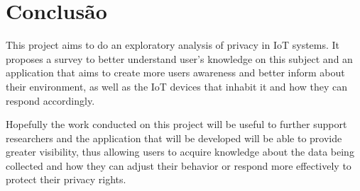 \documentclass[conference]{IEEEtran}
\begin{document}
\section{Conclusão}

This project aims to do an exploratory analysis of privacy in IoT systems.
It proposes a survey to better understand user's knowledge on this subject
and an application that aims to create more users awareness and better inform
about their environment, as well as the IoT devices that inhabit it and
how they can respond accordingly.

Hopefully the work conducted on this project will be useful to further support
researchers and the application that will be developed will be able to
provide greater visibility, thus allowing users to acquire knowledge about
the data being collected and how they can adjust their behavior or respond
more effectively to protect their privacy rights.





















\end{document}
